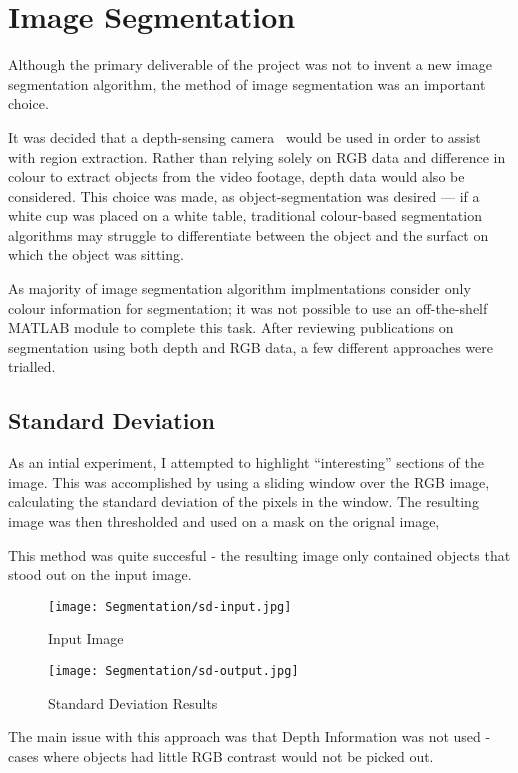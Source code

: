 \section{Image Segmentation}
Although the primary deliverable of the project was not to invent a new image segmentation algorithm, the method of image segmentation was an important choice.

It was decided that a depth-sensing camera~\cite{xtion} would be used in order to assist with region extraction. Rather than relying solely on RGB data and difference in colour to extract objects from the video footage, depth data would also be considered. This choice was made, as object-segmentation was desired --- if a white cup was placed on a white table, traditional colour-based segmentation algorithms may struggle to differentiate between the object and the surfact on which the object was sitting.

As majority of image segmentation algorithm implmentations consider only colour information for segmentation; it was not possible to use an off-the-shelf MATLAB module to complete this task. After reviewing publications on segmentation using both depth and RGB data, a few different approaches were trialled.

\subsection{Standard Deviation}
As an intial experiment, I attempted to highlight ``interesting'' sections of the image. This was accomplished by using a sliding window over the RGB image, calculating the standard deviation of the pixels in the window. The resulting image was then thresholded and used on a mask on the orignal image,

This method was quite succesful - the resulting image only contained objects that stood out on the input image.

\begin{figure}[H]
    \centering
    \texttt{[image: Segmentation/sd-input.jpg]}
    \caption{Input Image}
\end{figure}

\begin{figure}[H]
   \centering
   \texttt{[image: Segmentation/sd-output.jpg]}
   \caption{Standard Deviation Results}

\end{figure}

The main issue with this approach was that Depth Information was not used - cases where objects had little RGB contrast would not be picked out. 

